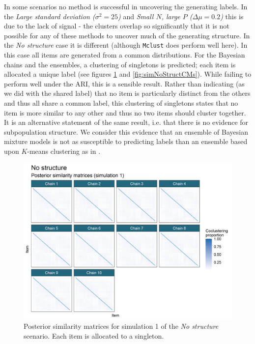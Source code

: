\documentclass[]{article}
\begin{document}
In some scenarios no method is successful in uncovering the generating labels. In the \emph{Large standard deviation ($\sigma^2 =25$)} and \emph{Small $N$, large $P$ ($\Delta \mu = 0.2$)} this is due to the lack of signal - the clusters overlap so significantly that it is not possible for any of these methods to uncover much of the generating structure. In the \emph{No structure} case it is different (although \texttt{Mclust} does perform well here). In this case all items are generated from a common distributions. For the Bayesian chains and the ensembles, a clustering of singletons is predicted; each item is allocated a unique label (see figures \ref{fig:simNoStructPSMs} and \ref{fig:simNoStructCMs}). While failing to perform well under the ARI, this is a sensible result. Rather than indicating (as we did with the shared label) that no item is particularly distinct from the others and thus all share a common label, this clustering of singletons states that no item is more similar to any other and thus no two items should cluster together. It is an alternative statement of the same result, i.e. that there is no evidence for subpopulation structure. We consider this evidence that an ensemble of Bayesian mixture models is not as susceptible to predicting labels than an ensemble based upon $K$-means clustering as in \cite{senbabaoglu2014reassessment,senbabaouglu2014critical}.

\begin{figure} %
	\centering
	\includegraphics[scale=0.65]{./Images/Simulations/PSMs/no_structureSim1.png}
	\caption{Posterior similarity matrices for simulation 1 of the \emph{No structure} scenario. Each item is allocated to a singleton.}
	\label{fig:simNoStructPSMs}
\end{figure}
\end{document}
